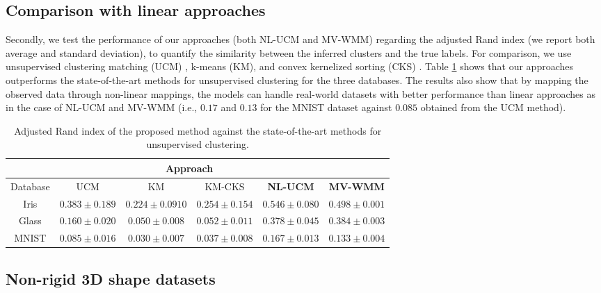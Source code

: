 \documentclass[]{article}
\begin{document}
\subsection{Comparison with linear approaches}

Secondly, we test the performance of our approaches (both NL-UCM and MV-WMM) regarding the adjusted Rand index (we report both average and standard deviation), to quantify the similarity between the inferred clusters \cite{Iwata16} and the true labels. For comparison, we use unsupervised clustering matching (UCM) \cite{Iwata16}, k-means (KM), and convex kernelized sorting (CKS) \cite{Djuric12}. Table \ref{tab:comparison} shows that our approaches outperforms the state-of-the-art methods for unsupervised clustering for the three databases. The results also show that by mapping the observed data through  non-linear mappings, the models can handle real-world datasets with better performance than linear approaches as in the case of NL-UCM and MV-WMM (i.e., $0.17$ and $0.13$ for the MNIST dataset against $0.085$ obtained from the UCM method). 

\begin{table}[ht!]
	\centering
	\caption{Adjusted Rand index of the proposed method against the state-of-the-art methods for unsupervised clustering.}
	\label{tab:comparison}
	\begin{tabular}{c c c c c c}
		\cline{2-6}
		& \multicolumn{4}{c}{\textbf{Approach}}\\
		\hline
		Database &  	UCM & KM & KM-CKS& \textbf{NL-UCM} & \textbf{MV-WMM}\\
		\hline\hline
		Iris & $0.383\pm0.189$ &  $0.224 \pm 0.0910$  &  $0.254 \pm 0.154$ &$\mathbf{0.546\pm 0.080}$ & $\mathbf{0.498\pm 0.001}$\\
		Glass & $0.160 \pm 0.020$ & $0.050 \pm 0.008$     &  $0.052 \pm 0.011$       & $\mathbf{0.378\pm 0.045}$ & $\mathbf{0.384\pm 0.003}$\\
		MNIST & $0.085 \pm 0.016$&      $0.030 \pm 0.007$   &  $0.037 \pm 0.008$  & $\mathbf{0.167\pm 0.013}$ & $\mathbf{0.133\pm 0.004}$\\
	\end{tabular}
\end{table}

\subsection{Non-rigid 3D shape datasets}
\end{document}
